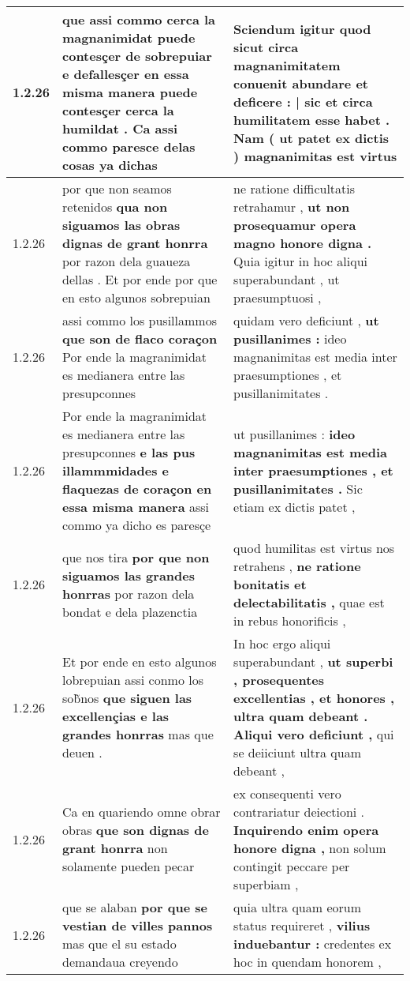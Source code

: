 \begin{tabular}{|p{1cm}|p{6.5cm}|p{6.5cm}|}
1.2.26 & que assi commo cerca la magnanimidat puede contesçer de sobrepuiar \textbf{ e defallesçer en essa misma manera puede contesçer cerca la humildat . } Ca assi commo paresce delas cosas ya dichas & Sciendum igitur quod sicut circa magnanimitatem conuenit abundare \textbf{ et deficere : | sic et circa humilitatem esse habet . } Nam ( ut patet ex dictis ) magnanimitas est virtus \\\hline
1.2.26 & por que non seamos retenidos \textbf{ qua non siguamos las obras dignas de grant honrra } por razon dela guaueza dellas . Et por ende por que en esto algunos sobrepuian & ne ratione difficultatis retrahamur , \textbf{ ut non prosequamur opera magno honore digna . } Quia igitur in hoc aliqui superabundant , ut praesumptuosi , \\\hline
1.2.26 & assi commo los pusillammos \textbf{ que son de flaco coraçon } Por ende la magranimidat es medianera entre las presupconnes & quidam vero deficiunt , \textbf{ ut pusillanimes : } ideo magnanimitas est media inter praesumptiones , et pusillanimitates . \\\hline
1.2.26 & Por ende la magranimidat es medianera entre las presupconnes \textbf{ e las pus illammmidades e flaquezas de coraçon en essa misma manera } assi commo ya dicho es paresçe & ut pusillanimes : \textbf{ ideo magnanimitas est media inter praesumptiones , et pusillanimitates . } Sic etiam ex dictis patet , \\\hline
1.2.26 & que nos tira \textbf{ por que non siguamos las grandes honrras } por razon dela bondat e dela plazenctia & quod humilitas est virtus nos retrahens , \textbf{ ne ratione bonitatis et delectabilitatis , } quae est in rebus honorificis , \\\hline
1.2.26 & Et por ende en esto algunos lobrepuian assi conmo los sob̃nos \textbf{ que siguen las excellençias e las grandes honrras } mas que deuen . & In hoc ergo aliqui superabundant , \textbf{ ut superbi , prosequentes excellentias , et honores , ultra quam debeant . Aliqui vero deficiunt , } qui se deiiciunt ultra quam debeant , \\\hline
1.2.26 & Ca en quariendo omne obrar obras \textbf{ que son dignas de grant honrra } non solamente pueden pecar & ex consequenti vero contrariatur deiectioni . \textbf{ Inquirendo enim opera honore digna , } non solum contingit peccare per superbiam , \\\hline
1.2.26 & que se alaban \textbf{ por que se vestian de villes pannos } mas que el su estado demandaua creyendo & quia ultra quam eorum status requireret , \textbf{ vilius induebantur : } credentes ex hoc in quendam honorem , \\\hline

\end{tabular}
